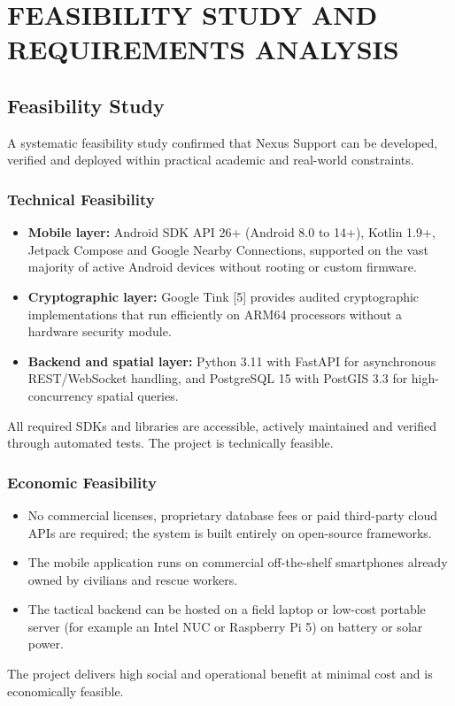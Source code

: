 \documentclass[12pt,a4paper]{report}
\begin{document}
\chapter{FEASIBILITY STUDY AND REQUIREMENTS ANALYSIS}

\section{Feasibility Study}
A systematic feasibility study confirmed that Nexus Support can be developed, verified and deployed within practical academic and real-world constraints.

\subsection{Technical Feasibility}
\begin{itemize}
    \item \textbf{Mobile layer:} Android SDK API 26+ (Android 8.0 to 14+), Kotlin 1.9+, Jetpack Compose and Google Nearby Connections, supported on the vast majority of active Android devices without rooting or custom firmware.
    \item \textbf{Cryptographic layer:} Google Tink [5] provides audited cryptographic implementations that run efficiently on ARM64 processors without a hardware security module.
    \item \textbf{Backend and spatial layer:} Python 3.11 with FastAPI for asynchronous REST/WebSocket handling, and PostgreSQL 15 with PostGIS 3.3 for high-concurrency spatial queries.
\end{itemize}
All required SDKs and libraries are accessible, actively maintained and verified through automated tests. The project is technically feasible.

\subsection{Economic Feasibility}
\begin{itemize}
    \item No commercial licenses, proprietary database fees or paid third-party cloud APIs are required; the system is built entirely on open-source frameworks.
    \item The mobile application runs on commercial off-the-shelf smartphones already owned by civilians and rescue workers.
    \item The tactical backend can be hosted on a field laptop or low-cost portable server (for example an Intel NUC or Raspberry Pi 5) on battery or solar power.
\end{itemize}
The project delivers high social and operational benefit at minimal cost and is economically feasible.
\end{document}
